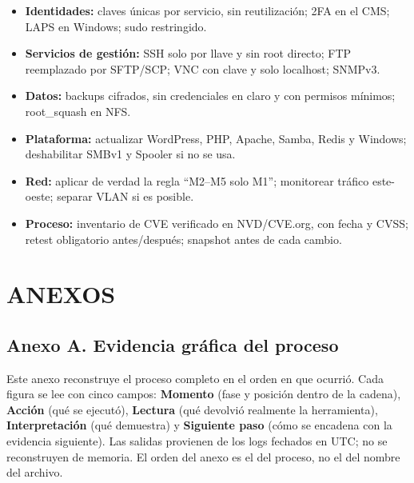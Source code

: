 \documentclass[11pt,a4paper]{article}
\begin{document}
\begin{itemize}
    \item \textbf{Identidades:} claves únicas por servicio, sin reutilización; 2FA en el CMS; LAPS en Windows; sudo restringido.
    \item \textbf{Servicios de gestión:} SSH solo por llave y sin root directo; FTP reemplazado por SFTP/SCP; VNC con clave y solo localhost; SNMPv3.
    \item \textbf{Datos:} backups cifrados, sin credenciales en claro y con permisos mínimos; root\_squash en NFS.
    \item \textbf{Plataforma:} actualizar WordPress, PHP, Apache, Samba, Redis y Windows; deshabilitar SMBv1 y Spooler si no se usa.
    \item \textbf{Red:} aplicar de verdad la regla ``M2--M5 solo M1''; monitorear tráfico este-oeste; separar VLAN si es posible.
    \item \textbf{Proceso:} inventario de CVE verificado en NVD/CVE.org, con fecha y CVSS; retest obligatorio antes/después; snapshot antes de cada cambio.
\end{itemize}


\section{ANEXOS}

\subsection{Anexo A. Evidencia gráfica del proceso}

Este anexo reconstruye el proceso completo en el orden en que ocurrió. Cada figura se lee con cinco campos: \textbf{Momento} (fase y posición dentro de la cadena), \textbf{Acción} (qué se ejecutó), \textbf{Lectura} (qué devolvió realmente la herramienta), \textbf{Interpretación} (qué demuestra) y \textbf{Siguiente paso} (cómo se encadena con la evidencia siguiente). Las salidas provienen de los logs fechados en UTC; no se reconstruyen de memoria. El orden del anexo es el del proceso, no el del nombre del archivo.
\end{document}
